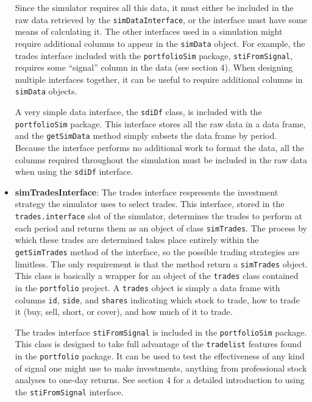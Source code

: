 \documentclass{article}
\begin{document}
\begin{itemize}
Since the simulator requires all this data, it must either be included
in the raw data retrieved by the \texttt{simDataInterface}, or the
interface must have some means of calculating it.  The other interfaces
used in a simulation might require additional columns to appear in the
\texttt{simData} object.  For example, the trades interface included
with the \texttt{portfolioSim} package, \texttt{stiFromSignal},
requires some ``signal'' column in the data (see section 4).  When
designing multiple interfaces together, it can be useful to require
additional columns in \texttt{simData} objects.

A very simple data interface, the \texttt{sdiDf} class, is included
with the \texttt{portfolioSim} package.  This interface stores all the
raw data in a data frame, and the \texttt{getSimData} method simply
subsets the data frame by period.  Because the interface performs no
additional work to format the data, all the columns required
throughout the simulation must be included in the raw data when using
the \texttt{sdiDf} interface.

\item{\bf{simTradesInterface}}: The trades interface respresents the
investment strategy the simulator uses to select trades.  This
interface, stored in the \texttt{trades.interface} slot of the
simulator, determines the trades to perform at each period and returns
them as an object of class \texttt{simTrades}.  The process by which
these trades are determined takes place entirely within the
\texttt{getSimTrades} method of the interface, so the possible trading
strategies are limitless.  The only requirement is that the method
return a \texttt{simTrades} object.  This class is basically a wrapper
for an object of the \texttt{trades} class contained in the
\texttt{portfolio} project.  A \texttt{trades} object is simply a data
frame with columns \texttt{id}, \texttt{side}, and \texttt{shares}
indicating which stock to trade, how to trade it (buy, sell, short, or
cover), and how much of it to trade.

The trades interface \texttt{stiFromSignal} is included in the
\texttt{portfolioSim} package.  This class is designed to take full
advantage of the \texttt{tradelist} features found in the
\texttt{portfolio} package.  It can be used to test the effectiveness
of any kind of signal one might use to make investments, anything from
professional stock analyses to one-day returns.  See section 4 for a
detailed introduction to using the \texttt{stiFromSignal} interface.

\end{itemize}
\end{document}

